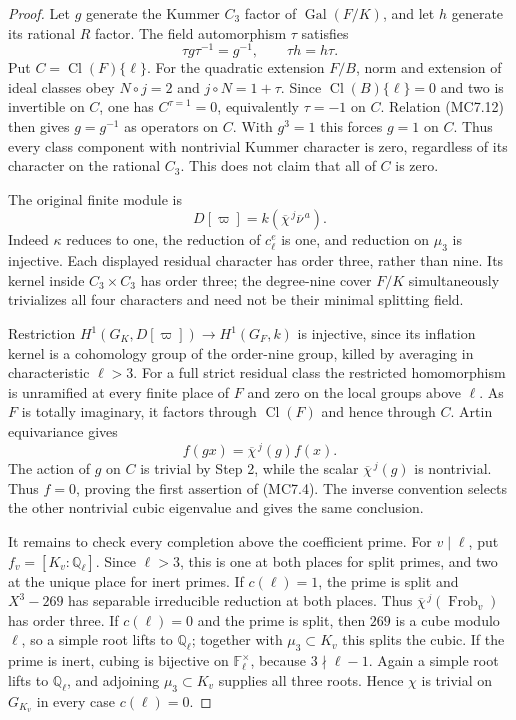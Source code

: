 \begin{proof}
Let $g$ generate the Kummer $C_3$ factor of
$\operatorname{Gal}(F/K)$, and let $h$ generate its rational
$R$ factor.  The field automorphism $\tau$ satisfies
\[
       \tau g\tau^{-1}=g^{-1},\qquad\tau h=h\tau.
 \tag{MC7.12}
\]
Put $C=\operatorname{Cl}(F)\{\ell\}$.
For the quadratic extension $F/B$, norm and extension of
ideal classes obey $N\circ j=2$ and $j\circ N=1+\tau$.
Since $\operatorname{Cl}(B)\{\ell\}=0$ and two is invertible
on $C$, one has $C^{\tau=1}=0$, equivalently $\tau=-1$ on
$C$.  Relation (MC7.12) then gives $g=g^{-1}$ as operators
on $C$.  With $g^3=1$ this forces $g=1$ on $C$.
Thus every class component with nontrivial Kummer character
is zero, regardless of its character on the rational $C_3$.
This does not claim that all of $C$ is zero.

The original finite module is
\[
                     D[\varpi]=k(\overline\chi^{\,j}\overline\nu^{\,a}).
 \tag{MC7.13}
\]
Indeed $\kappa$ reduces to one, the reduction of $c_\ell^e$
is one, and reduction on $\mu_3$ is injective.
Each displayed residual character has order three, rather
than nine.  Its kernel inside $C_3\times C_3$ has order
three; the degree-nine cover $F/K$ simultaneously trivializes
all four characters and need not be their minimal splitting
field.

Restriction $H^1(G_K,D[\varpi])\to H^1(G_F,k)$ is injective,
since its inflation kernel is a cohomology group of the
order-nine group, killed by averaging in characteristic
$\ell>3$.  For a full strict residual class the restricted
homomorphism is unramified at every finite place of $F$ and
zero on the local groups above $\ell$.  As $F$ is totally
imaginary, it factors through $\operatorname{Cl}(F)$ and
hence through $C$.  Artin equivariance gives
\[
                  f(gx)=\overline\chi^{\,j}(g)f(x).
 \tag{MC7.14}
\]
The action of $g$ on $C$ is trivial by Step 2, while the
scalar $\overline\chi^{\,j}(g)$ is nontrivial.  Thus $f=0$,
proving the first assertion of (MC7.4).  The inverse convention
selects the other nontrivial cubic eigenvalue and gives the
same conclusion.

It remains to check every completion above the coefficient
prime.  For $v\mid\ell$, put $f_v=[K_v:\mathbb Q_\ell]$.
Since $\ell>3$, this is one at both places for split primes,
and two at the unique place for inert primes.
If $c(\ell)=1$, the prime is split and $X^3-269$ has
separable irreducible reduction at both places.  Thus
$\overline\chi^{\,j}(\operatorname{Frob}_v)$ has order three.
If $c(\ell)=0$ and the prime is split, then $269$ is a cube
modulo $\ell$, so a simple root lifts to $\mathbb Q_\ell$;
together with $\mu_3\subset K_v$ this splits the cubic.
If the prime is inert, cubing is bijective on
$\mathbb F_\ell^\times$, because $3\nmid\ell-1$.
Again a simple root lifts to $\mathbb Q_\ell$, and adjoining
$\mu_3\subset K_v$ supplies all three roots.  Hence
$\chi$ is trivial on $G_{K_v}$ in every case $c(\ell)=0$.


\end{proof}
